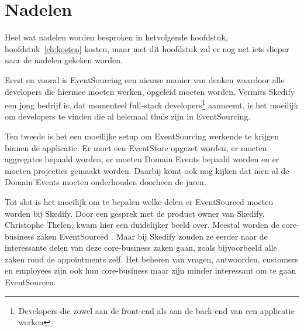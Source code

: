 
\chapter{Nadelen}
\label{ch:nadelen}

Heel wat nadelen worden besproken in hetvolgende hoofdstuk, hoofdstuk~\ref{ch:kosten} kosten, maar met dit hoofdstuk zal er nog net iets dieper naar de nadelen gekeken worden.

Eerst en vooral is EventSourcing een nieuwe manier van denken waardoor alle developers die hiermee moeten werken, opgeleid moeten worden. Vermits Skedify een jong bedrijf is, dat momenteel full-stack developers\footnote{Developers die zowel aan de front-end als aan de back-end van een applicatie werken} aanneemt, is het moeilijk om developers te vinden die al helemaal thuis zijn in EventSourcing.

Ten tweede is het een moeilijke setup om EventSourcing werkende te krijgen binnen de applicatie. Er moet een EventStore opgezet worden, er moeten aggregates bepaald worden, er moeten Domain Events bepaald worden en er moeten projecties gemaakt worden. Daarbij komt ook nog kijken dat men al de Domain Events moeten onderhouden doorheen de jaren.

Tot slot is het moeilijk om te bepalen welke delen er EventSourced moeten worden bij Skedify. Door een gesprek met de product owner van Skedify, Christophe Thelen, kwam hier een duidelijker beeld over. Meestal worden de core-business zaken EventSourced \autocite{Young2010WhyEventSourcing}. Maar bij Skedify zouden ze eerder naar de interessante delen van deze core-business zaken gaan, zoals bijvoorbeeld alle zaken rond de appointments zelf. Het beheren van vragen, antwoorden, customers en employees zijn ook hun core-business maar zijn minder interessant om te gaan EventSourcen.